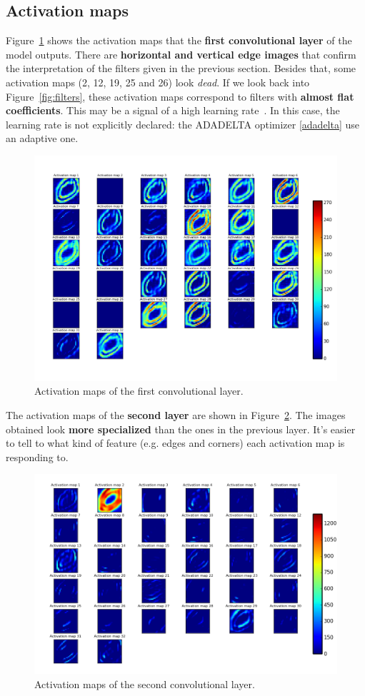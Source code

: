 \subsection{Activation maps}
Figure~\ref{fig:activation_maps} shows the activation maps that the \textbf{first convolutional layer} of the model outputs. There are \textbf{horizontal and vertical edge images} that confirm the interpretation of the filters given in the previous section. Besides that, some activation maps (2, 12, 19, 25 and 26) look \textit{dead}. If we look back into Figure~\ref{fig:filters}, these activation maps correspond to filters with \textbf{almost flat coefficients}. This may be a signal of a high learning rate~\cite{cs231n}. In this case, the learning rate is not explicitly declared: the ADADELTA optimizer \ref{adadelta} use an adaptive one.
\begin{figure}
	\centering
	\includegraphics[width=0.85\linewidth, keepaspectratio]{figures/activation_maps_conv2d_1.png}
	\caption{Activation maps of the first convolutional layer.}
	\label{fig:activation_maps}
\end{figure}

The activation maps of the \textbf{second layer} are shown in Figure~\ref{fig:activation_maps2}. The images obtained look \textbf{more specialized} than the ones in the previous layer. It's easier to tell to what kind of feature (e.g. edges and corners) each activation map is responding to.
\begin{figure}
	\centering
	\includegraphics[width=0.85\linewidth, keepaspectratio]{figures/activation_maps_conv2d_2.png}
	\caption{Activation maps of the second convolutional layer.}
	\label{fig:activation_maps2}
\end{figure}

